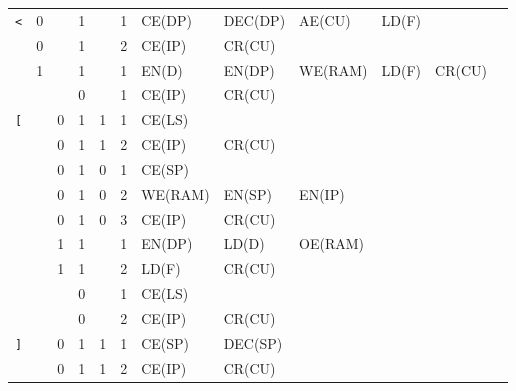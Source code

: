 \begin{landscape}
\begin{longtable}[c] {c|cccc|c|llllll}
    \rowcolor{White} \texttt{<}   & 0 &   & 1     &      & 1     & CE(DP)   & DEC(DP)  & AE(CU)  & LD(F)  &        &        \\
    \rowcolor{White}              & 0 &   & 1     &      & 2     & CE(IP)   & CR(CU)   &         &        &        &        \\
    \rowcolor{Gray}               & 1 &   & 1     &      & 1     & EN(D)    & EN(DP)   & WE(RAM) & LD(F)  & CR(CU) &        \\
    \rowcolor{White}              &   &   & 0     &      & 1     & CE(IP)   & CR(CU)   &         &        &        &        \\ \hline
    
    \rowcolor{Gray}  \texttt{[}   &   & 0 & 1     & 1    & 1     & CE(LS)   &          &         &        &        &        \\
    \rowcolor{Gray}               &   & 0 & 1     & 1    & 2     & CE(IP)   & CR(CU)   &         &        &        &        \\      
    \rowcolor{White}              &   & 0 & 1     & 0    & 1     & CE(SP)   &          &         &        &        &        \\
    \rowcolor{White}              &   & 0 & 1     & 0    & 2     & WE(RAM)  & EN(SP)   & EN(IP)  &        &        &        \\
    \rowcolor{White}              &   & 0 & 1     & 0    & 3     & CE(IP)   & CR(CU)   &         &        &        &        \\
    \rowcolor{Gray}               &   & 1 & 1     &      & 1     & EN(DP)   & LD(D)    & OE(RAM) &        &        &        \\
    \rowcolor{Gray}               &   & 1 & 1     &      & 2     & LD(F)    & CR(CU)   &         &        &        &        \\
    \rowcolor{White}              &   &   & 0     &      & 1     & CE(LS)   &          &         &        &        &        \\
    \rowcolor{White}              &   &   & 0     &      & 2     & CE(IP)   & CR(CU)   &         &        &        &        \\ \hline
    
    \rowcolor{White} \texttt{]}   &   & 0 & 1     & 1    & 1     & CE(SP)   & DEC(SP)  &         &        &        &        \\
    \rowcolor{White}              &   & 0 & 1     & 1    & 2     & CE(IP)   & CR(CU)   &         &        &        &        \\
        

\end{longtable}
\end{landscape}
